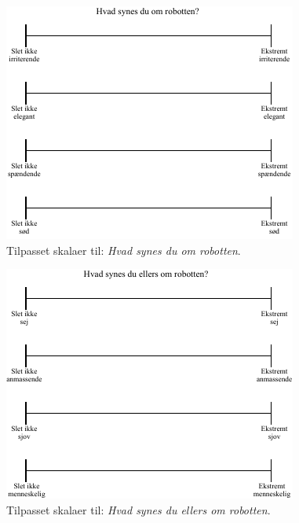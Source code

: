 %
\begin{figure}[H]
\centering
\includegraphics[width =\textwidth]{Figure/TilpasningAfSkalaer/TilpassetHvadSynesDuOmR} 
\caption{Tilpasset skalaer til: \textit{Hvad synes du om robotten}.}
\label{fig:TilpassetHvadSynesDuOmR}
\end{figure}
\noindent
%
%
\begin{figure}[H]
\centering
\includegraphics[width =\textwidth]{Figure/TilpasningAfSkalaer/HvadSynesDuEllersOmR} 
\caption{Tilpasset skalaer til: \textit{Hvad synes du ellers om robotten}.}
\label{fig:TilpasningHvadSynesDuEllersOmR}
\end{figure}
\noindent
%
 
